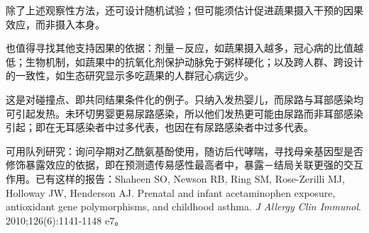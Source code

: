 除了上述观察性方法，还可设计随机试验；但可能须估计促进蔬果摄入干预的因果效应，而非摄入本身。

也值得寻找其他支持因果的依据：剂量－反应，如蔬果摄入越多，冠心病的比值越低；生物机制，如蔬果中的抗氧化剂保护动脉免于粥样硬化；以及跨人群、跨设计的一致性，如生态研究显示多吃蔬果的人群冠心病远少。
\begin{answerlist}
\item[2.] 这是对碰撞点、即共同结果条件化的例子。只纳入发热婴儿，而尿路与耳部感染均可引起发热。未环切男婴更易尿路感染，所以他们发热更可能由尿路而非耳部感染引起；即在无耳感染者中过多代表，也因在有尿路感染者中过多代表。
\item[3.] 可用队列研究：询问孕期对乙酰氨基酚使用，随访后代哮喘，寻找母亲基因型是否修饰暴露效应的依据，即在预测遗传易感性最高者中，暴露－结局关联更强的交互作用。已有这样的报告：Shaheen SO, Newson RB, Ring SM, Rose-Zerilli MJ, Holloway JW, Henderson AJ. Prenatal and infant acetaminophen exposure, antioxidant gene polymorphisms, and childhood asthma. \textit{J Allergy Clin Immunol}. 2010;126(6):1141-1148 e7。
\end{answerlist}

